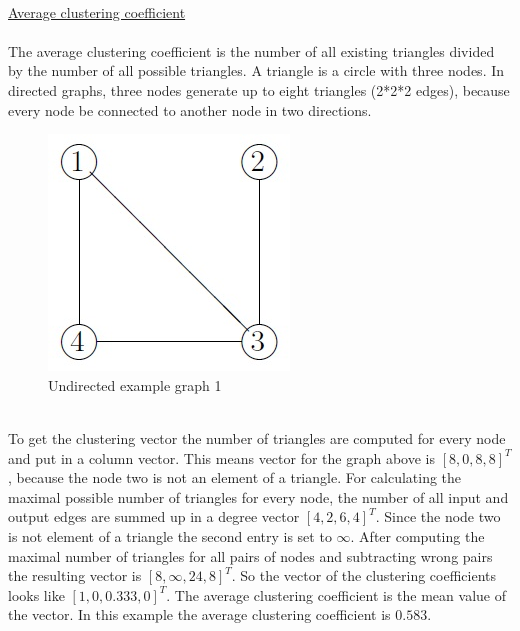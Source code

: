 \documentclass[12pt]{report}
\begin{document}
\\
\underline{Average clustering coefficient}\\
\\
The average clustering coefficient is the number of all existing triangles divided by the number of all possible triangles. A triangle is a circle with three nodes. In directed graphs, three nodes generate up to eight triangles (2*2*2 edges), because every node be connected to another node in two directions.\\
\begin{figure}[h]
\centering
\includegraphics[scale=.6]{graph}
\caption{Undirected example graph 1}
\label{FIG:abb45}
\end{figure}
\\
To get the clustering vector the number of triangles are computed for every node and put in a column vector. This means vector for the graph above is $ [8,0,8,8]^T $, because the node two is not an element of a triangle. For calculating the maximal possible number of triangles for every node, the number of all input and output edges are summed up in a degree vector $ [4,2,6,4]^T $. Since the node two is not element of a triangle the second entry is set to $ \infty $. After computing the maximal number of triangles for all pairs of nodes and subtracting wrong pairs the resulting vector is $ [8,\infty,24,8]^T $. So the vector of the clustering coefficients looks like $ [1,0,0.333,0]^T $. The average clustering coefficient is the mean value of the vector. In this example the average clustering coefficient is $ 0.583 $.\\
\end{document}
